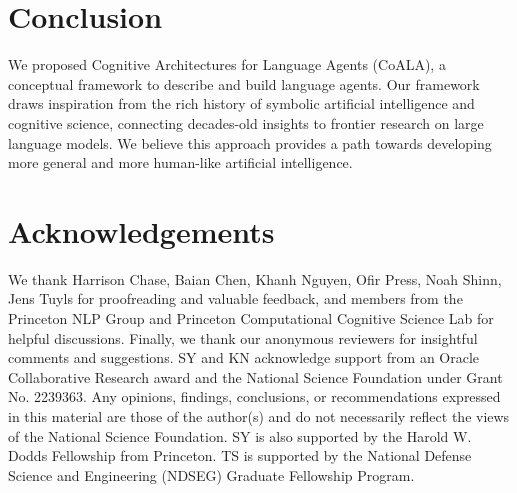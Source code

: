 \documentclass[10pt]{article} %
\begin{document}
\section{Conclusion}
\label{sec:conclusion}

We proposed Cognitive Architectures for Language Agents (CoALA), a conceptual framework to describe and build language agents. Our framework draws inspiration from the rich history of symbolic artificial intelligence and cognitive science, connecting decades-old insights to frontier research on large language models. We believe this approach provides a path towards developing more general and more human-like artificial intelligence.



\section*{Acknowledgements}
We thank Harrison Chase, Baian Chen, Khanh Nguyen, Ofir Press, Noah Shinn, Jens Tuyls for proofreading and valuable feedback, and members from the Princeton NLP Group and Princeton Computational Cognitive Science Lab for helpful discussions. Finally, we thank our anonymous reviewers for insightful comments and suggestions.
SY and KN acknowledge support from an Oracle Collaborative Research award and the National Science Foundation under Grant No. 2239363. Any opinions, findings, conclusions, or recommendations expressed in this material are those of the author(s) and do not necessarily reflect the views of the National Science Foundation. SY is also supported by the Harold W. Dodds Fellowship from Princeton. TS is supported by the National Defense Science and Engineering (NDSEG) Graduate Fellowship Program.



\end{document}
